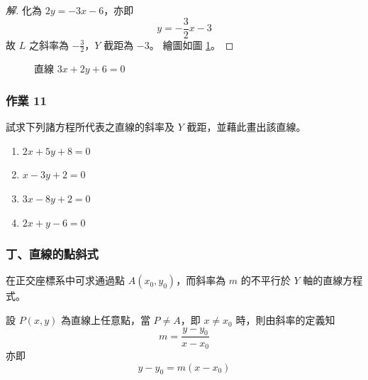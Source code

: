 \begin{proof}[解]
化為 $2y = -3x - 6$，亦即
\[ y = -\frac{3}{2}x - 3 \]
故 $L$ 之斜率為 $-\frac{3}{2}$，$Y$ 截距為 $-3$。
繪圖如圖 \ref{fig:4-18}。
\end{proof}

\begin{figure}[H]
\centering
{}
\caption{直線 $3x+2y+6=0$}
\label{fig:4-18}
\end{figure}

\subsubsection*{作業 11}
試求下列諸方程所代表之直線的斜率及 $Y$ 截距，並藉此畫出該直線。
\begin{enumerate}[label=(\roman*), leftmargin=2em]
  \item $2x + 5y + 8 = 0$
  \item $x - 3y + 2 = 0$
  \item $3x - 8y + 2 = 0$
  \item $2x + y - 6 = 0$
\end{enumerate}

\subsubsection*{丁、直線的點斜式}

在正交座標系中可求通過點 $A(x_0, y_0)$，而斜率為 $m$ 的不平行於 $Y$ 軸的直線方程式。

設 $P(x, y)$ 為直線上任意點，當 $P \neq A$，即 $x \neq x_0$ 時，則由斜率的定義知
\[ m = \frac{y - y_0}{x - x_0} \]
亦即
\begin{equation}
y - y_0 = m(x - x_0)
\label{eq:b3-4-11}
\end{equation}

